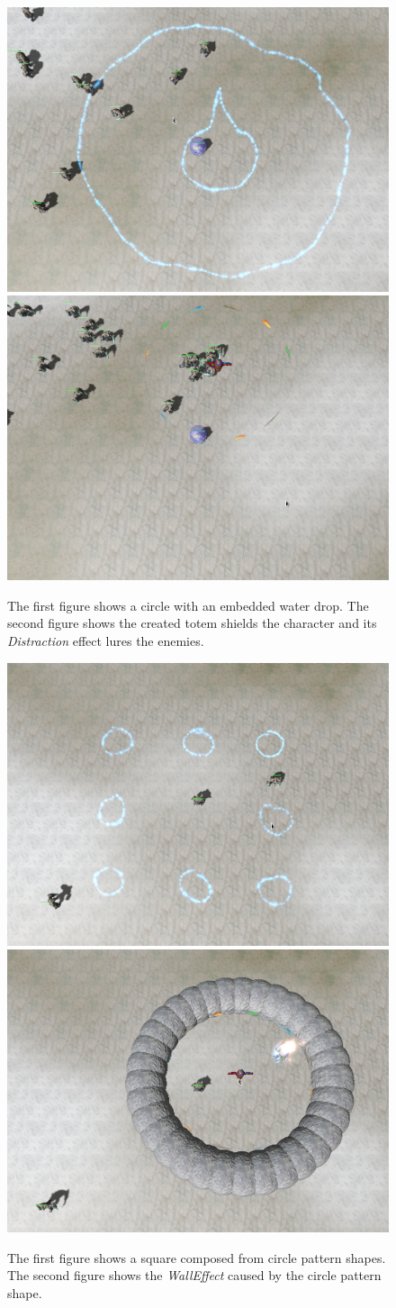 \begin{figure}[p]
\centering
\includegraphics[width=.47\linewidth]{ext/scr/embwaterDrop.png}
\quad
\includegraphics[width=.47\linewidth]{ext/scr/embwaterDrope.png}
\caption{The first figure shows a circle with an embedded water drop. The second figure shows the created totem shields the character and its \emph{Distraction} effect lures the enemies.}
\label{fig:spell:embwaterDrop}
\end{figure}


\begin{figure}[p]
\centering
\includegraphics[width=.47\linewidth]{ext/scr/patcircle.png}
\quad
\includegraphics[width=.47\linewidth]{ext/scr/patcirclee.png}
\caption{The first figure shows a square composed from circle pattern shapes. The second figure shows the \emph{WallEffect} caused by the circle pattern shape. }
\label{fig:spell:patcircle}
\end{figure}

